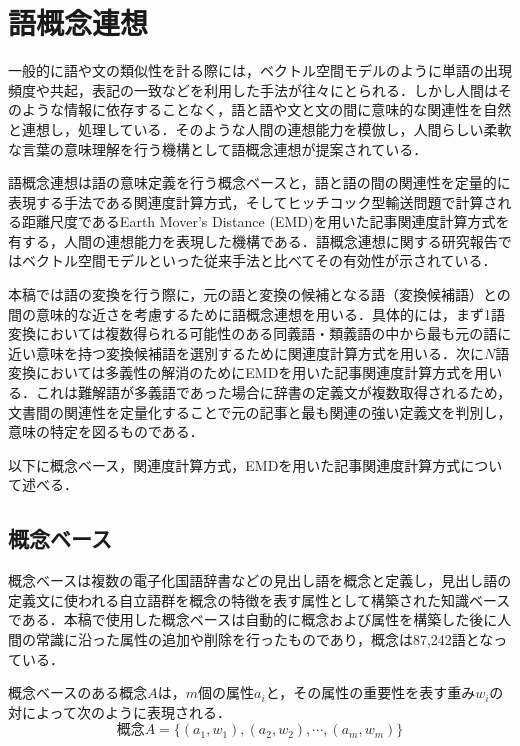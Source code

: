 \documentclass[japanese]{jnlp_1.4}
\begin{document}
\section{語概念連想}
\label{Gogainen}

一般的に語や文の類似性を計る際には，ベクトル空間モデル\cite{Article_08}のように単語の出現頻度や共起，表記の一致などを利用した手法が往々にとられる．しかし人間はそのような情報に依存することなく，語と語や文と文の間に意味的な関連性を自然と連想し，処理している．そのような人間の連想能力を模倣し，人間らしい柔軟な言葉の意味理解を行う機構として語概念連想が提案されている．

語概念連想は語の意味定義を行う概念ベース\cite{Article_04}と，語と語の間の関連性を定量的に表現する手法である関連度計算方式\cite{Article_05}，そしてヒッチコック型輸送問題\cite{Book_06}で計算される距離尺度であるEarth Mover's Distance (EMD)を用いた記事関連度計算方式\cite{Article_06}を有する，人間の連想能力を表現した機構である．語概念連想に関する研究報告ではベクトル空間モデルといった従来手法と比べてその有効性が示されている\cite{Article_05}．

本稿では語の変換を行う際に，元の語と変換の候補となる語（変換候補語）との間の意味的な近さを考慮するために語概念連想を用いる．具体的には，まず1語変換においては複数得られる可能性のある同義語・類義語の中から最も元の語に近い意味を持つ変換候補語を選別するために関連度計算方式を用いる．次に$N$語変換においては多義性の解消のためにEMDを用いた記事関連度計算方式を用いる．これは難解語が多義語であった場合に辞書の定義文が複数取得されるため，文書間の関連性を定量化することで元の記事と最も関連の強い定義文を判別し，意味の特定を図るものである．

以下に概念ベース，関連度計算方式，EMDを用いた記事関連度計算方式について述べる．



\subsection{概念ベース}

概念ベースは複数の電子化国語辞書などの見出し語を概念と定義し，見出し語の定義文に使われる自立語群を概念の特徴を表す属性として構築された知識ベースである．本稿で使用した概念ベースは自動的に概念および属性を構築した後に人間の常識に沿った属性の追加や削除を行ったものであり，概念は87,242語となっている．

概念ベースのある概念$A$は，$m$個の属性$a_i$と，その属性の重要性を表す重み$w_i$の対によって次のように表現される．
\[
 \text{概念} A=\{(a_1, w_1), (a_2, w_2), \cdots , (a_m, w_m)\}
\]
\end{document}
